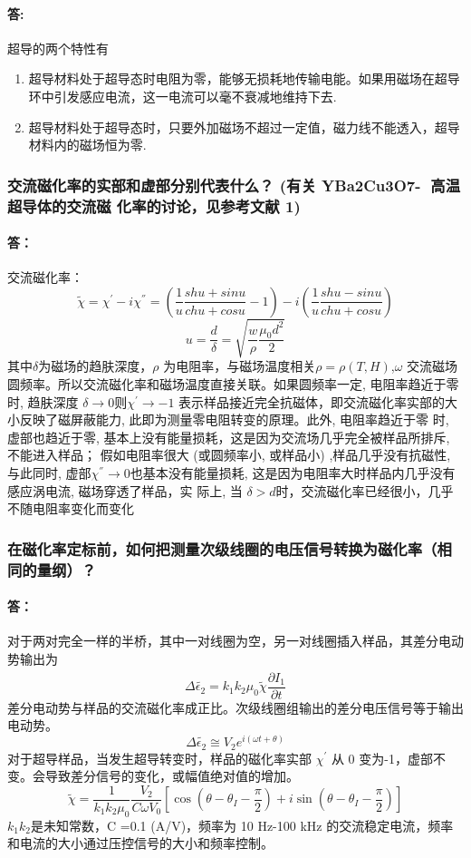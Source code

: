 \documentclass{ctexart}                                     %
\theoremstyle{ansstyle}
\begin{document}
\paragraph{答:} 超导的两个特性有
\begin{enumerate}
    \item 超导材料处于超导态时电阻为零，能够无损耗地传输电能。如果用磁场在超导环中引发感应电流，这一电流可以毫不衰减地维持下去.
    \item 超导材料处于超导态时，只要外加磁场不超过一定值，磁力线不能透入，超导材料内的磁场恒为零.
\end{enumerate}

\subsubsection{交流磁化率的实部和虚部分别代表什么？ (有关 YBa2Cu3O7- 高温超导体的交流磁
    化率的讨论，见参考文献 1) }
\paragraph{答：} 交流磁化率：
$$\widetilde{\chi}  =\chi^{'}-i\chi^{''}=(\frac{1}{u}\frac{shu+sinu}{chu+cosu}-1 )-i(\frac{1}{u}\frac{shu-sinu}{chu+cos u}  )  $$
$$ u =\frac{d }{\delta}=\sqrt{\frac{w}{\rho}\frac{\mu_{0}d^{2}}{2}  } $$
其中$ \delta $为磁场的趋肤深度，$ \rho $ 为电阻率，与磁场温度相关$\rho=\rho(T,H)$,$ \omega $
交流磁场圆频率。所以交流磁化率和磁场温度直接关联。如果圆频率一定, 电阻率趋近于零时, 趋肤深度
$ \delta \to 0 $则$ \chi^{'}\to -1 $  表示样品接近完全抗磁体，即交流磁化率实部的大小反映了磁屏蔽能力, 此即为测量零电阻转变的原理。此外, 电阻率趋近于零 时,
虚部也趋近于零, 基本上没有能量损耗，这是因为交流场几乎完全被样品所排斥, 不能进入样品；
假如电阻率很大 (或圆频率小, 或样品小) ,样品几乎没有抗磁性, 与此同时, 虚部$ \chi^{''} \to 0$也基本没有能量损耗, 这是因为电阻率大时样品内几乎没有感应涡电流, 磁场穿透了样品，实 际上, 当
$\delta > d$时，交流磁化率已经很小，几乎不随电阻率变化而变化
\subsubsection{ 在磁化率定标前，如何把测量次级线圈的电压信号转换为磁化率（相同的量纲）？}
\paragraph{答：}对于两对完全一样的半桥，其中一对线圈为空，另一对线圈插入样品，其差分电动势输出为
$$ \Delta \widetilde{\epsilon_{2}}=k_{1}k_{2}\mu_{0}\widetilde{\chi}\frac{\partial \widehat{I_{1}}}{\partial t}  $$
差分电动势与样品的交流磁化率成正比。次级线圈组输出的差分电压信号等于输出电动势。
$$ \Delta \widetilde{\epsilon_{2}}\cong V_{2}e^{i(\omega t +\theta)}$$
对于超导样品，当发生超导转变时，样品的磁化率实部 $ \chi^{'} $ 从 0 变为-1，虚部不变。会导致差分信号的变化，或幅值绝对值的增加。
$$ \widetilde{\chi} =\frac{1}{k_{1}k_{2}\mu_{0}}\frac{V_{2}}{C\omega V_{0}}[\cos(\theta-\theta_{I}-\frac{\pi}{2})+i\sin(\theta-\theta_{I}-\frac{\pi}{2})]    $$
$k_{1}k_{2}$是未知常数，C =0.1 (A/V)，频率为 10 Hz-100 kHz 的交流稳定电流，频率和电流的大小通过压控信号的大小和频率控制。
\end{document}
